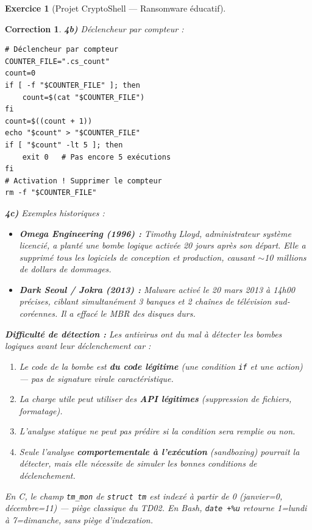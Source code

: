 \documentclass[a4paper,11pt]{article}
\theoremstyle{plain}
\newtheorem{correction}{Correction}
\theoremstyle{definition}
\newtheorem{exercice}{Exercice}
\begin{document}
\begin{exercice}[Projet CryptoShell --- Ransomware éducatif]
\begin{correction}
\textbf{4b)} Déclencheur par compteur :
\begin{lstlisting}[title=Déclencheur par compteur]
# Déclencheur par compteur
COUNTER_FILE=".cs_count"
count=0
if [ -f "$COUNTER_FILE" ]; then
    count=$(cat "$COUNTER_FILE")
fi
count=$((count + 1))
echo "$count" > "$COUNTER_FILE"
if [ "$count" -lt 5 ]; then
    exit 0   # Pas encore 5 exécutions
fi
# Activation ! Supprimer le compteur
rm -f "$COUNTER_FILE"
\end{lstlisting}

\textbf{4c)} Exemples historiques :
\begin{itemize}
    \item \textbf{Omega Engineering (1996) :} Timothy Lloyd, administrateur système licencié, a planté une bombe logique activée 20 jours après son départ. Elle a supprimé tous les logiciels de conception et production, causant $\sim$10 millions de dollars de dommages.
    \item \textbf{Dark Seoul / Jokra (2013) :} Malware activé le 20 mars 2013 à 14h00 précises, ciblant simultanément 3 banques et 2 chaînes de télévision sud-coréennes. Il a effacé le MBR des disques durs.
\end{itemize}

\textbf{Difficulté de détection :} Les antivirus ont du mal à détecter les bombes logiques \textit{avant} leur déclenchement car :
\begin{enumerate}
    \item Le code de la bombe est \textbf{du code légitime} (une condition \texttt{if} et une action) --- pas de signature virale caractéristique.
    \item La charge utile peut utiliser des \textbf{API légitimes} (suppression de fichiers, formatage).
    \item L'analyse statique ne peut pas prédire si la condition sera remplie ou non.
    \item Seule l'analyse \textbf{comportementale à l'exécution} (sandboxing) pourrait la détecter, mais elle nécessite de simuler les bonnes conditions de déclenchement.
\end{enumerate}

\begin{attention}
En C, le champ \texttt{tm\_mon} de \texttt{struct tm} est indexé à partir de 0 (janvier=0, décembre=11) --- piège classique du TD02. En Bash, \texttt{date +\%u} retourne 1=lundi à 7=dimanche, sans piège d'indexation.
\end{attention}


\end{correction}
\end{exercice}
\end{document}
